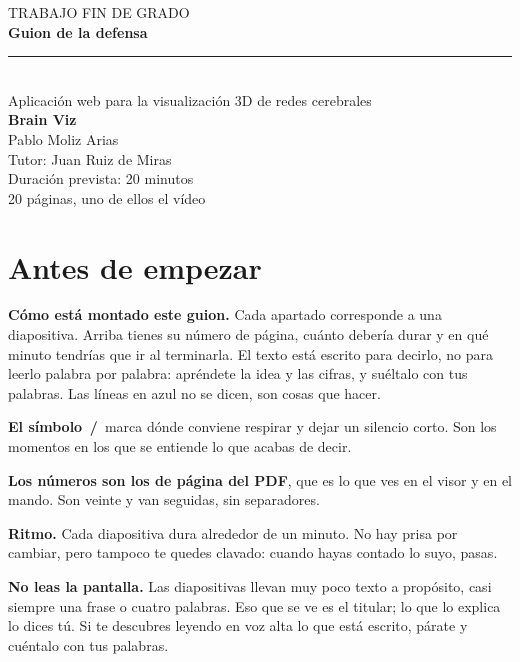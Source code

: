 \documentclass[12pt, a4paper]{article}
\newcommand{\pausa}{{\color{azul}\bfseries\,/\,}}
\begin{document}
\thispagestyle{empty}
\vspace*{2.5cm}
\begin{center}
	{\footnotesize\color{gris} TRABAJO FIN DE GRADO}\\[1.2em]
	{\LARGE\bfseries Guion de la defensa}\\[0.6em]
	{\color{azul}\rule{4em}{2.5pt}}\\[0.8em]
	{\large Aplicación web para la visualización 3D de redes cerebrales}\\[0.3em]
	{\large\bfseries Brain Viz}\\[2.2em]
	Pablo Moliz Arias\\[0.3em]
	{\color{gris} Tutor: Juan Ruiz de Miras}\\[2.2em]
	{\footnotesize\color{gris} Duración prevista: 20 minutos\\
	 20 páginas, uno de ellos el vídeo}
\end{center}
\vfill
\newpage

\section*{Antes de empezar}

\textbf{Cómo está montado este guion.} Cada apartado corresponde a una diapositiva. Arriba tienes su
número de página, cuánto debería durar y en qué minuto tendrías que ir al terminarla. El texto está escrito para
decirlo, no para leerlo palabra por palabra: apréndete la idea y las cifras, y suéltalo con tus
palabras. Las líneas en azul no se dicen, son cosas que hacer.

\textbf{El símbolo \pausa} marca dónde conviene respirar y dejar un silencio corto. Son los momentos
en los que se entiende lo que acabas de decir.

\textbf{Los números son los de página del PDF}, que es lo que ves en el visor y en el mando. Son
veinte y van seguidas, sin separadores.

\textbf{Ritmo.} Cada diapositiva dura alrededor de un minuto. No hay prisa por cambiar, pero
tampoco te quedes clavado: cuando hayas contado lo suyo, pasas.

\textbf{No leas la pantalla.} Las diapositivas llevan muy poco texto a propósito, casi siempre una
frase o cuatro palabras. Eso que se ve es el titular; lo que lo explica lo dices tú. Si te descubres
leyendo en voz alta lo que está escrito, párate y cuéntalo con tus palabras.
\end{document}
